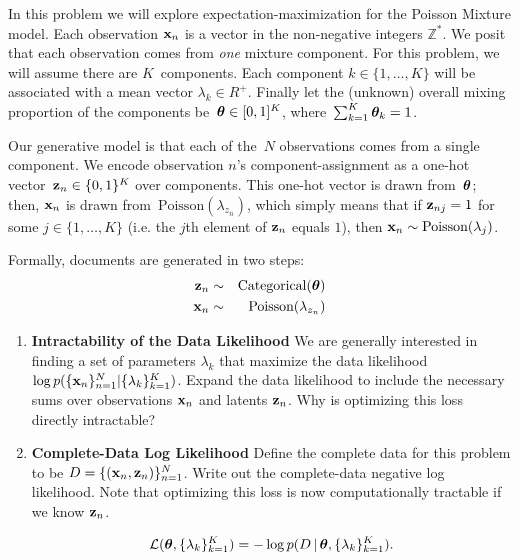 \documentclass[submit]{harvardml}
\begin{document}
\begin{problem}

In this problem we will explore expectation-maximization for the
Poisson Mixture model.  Each observation $\mathbf{x}_n$ is a vector in the
non-negative integers $\mathbb{Z}^{*}$.  We posit that each
observation comes from \emph{one} mixture component.  For this
problem, we will assume there are $K$~components. Each component $k
\in \{1, \ldots, K\}$ will be associated with a mean vector $\lambda_k
\in R^{+}$.  Finally let the (unknown) overall mixing proportion of
the components be~$\boldsymbol{\theta} \in [0,1]^K$, where~${\sum_{k=1}^K
  \boldsymbol{\theta}_k=1}$.

Our generative model is that each of the~$N$ observations comes from a
single component.  We encode observation $n$'s component-assignment as
a one-hot vector~${\mathbf{z}_n \in \{0,1\}^K}$ over components. This
one-hot vector is drawn from~$\boldsymbol{\theta}$; then, $\mathbf{x}_n$ is drawn
from~$\text{Poisson}(\lambda_{z_n} )$, which simply means that if $\mathbf{z}_{nj} = 1$ for some $j \in \{1,\ldots, K\}$ (i.e. the $j$th element of $\mathbf{z}_n$ equals $1$), then $\mathbf{x}_n \sim \text{Poisson}(\lambda_j)$. 

Formally, documents are generated in two
steps:
\begin{eqnarray*}
 \mathbf{z}_n &\sim& \text{Categorical}(\boldsymbol{\theta}) \\
 \mathbf{x}_n &\sim& \text{Poisson}(\lambda_{z_n} )
\end{eqnarray*}

  \begin{enumerate}

  \item \textbf{Intractability of the Data Likelihood} We are
    generally interested in finding a set of parameters $\lambda_k$
    that maximize the data likelihood $\log p(\{\mathbf{x}_n\}^N_{n=1}|\{\lambda_k\}^K_{k = 1})$.
    Expand the data likelihood to include the necessary sums over
    observations $\mathbf{x}_n$ and latents $\mathbf{z}_n$.  Why is optimizing this loss
    directly intractable?
    
\item \textbf{Complete-Data Log Likelihood} Define the complete data for this problem to be $D = \{(\mathbf{x}_n, \mathbf{z}_n)\}_{n=1}^N$. Write out the complete-data negative log likelihood. Note that optimizing this loss is now computationally tractable if we know $\mathbf{z}_n$.

\[\mathcal{L}(\boldsymbol{\theta}, \{\lambda_k\}^K_{k=1}) =  -\log p(D \,|\,\boldsymbol{\theta}, \{\lambda_k\}^K_{k=1}).\] 
    


\end{enumerate}
\end{problem}
\end{document}

